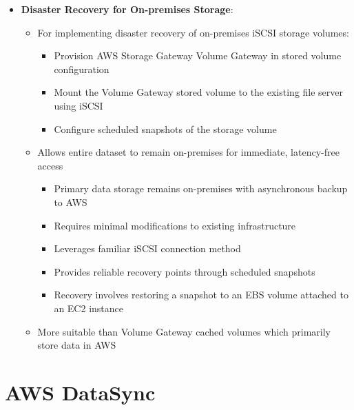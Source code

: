 \documentclass[11pt,a4paper]{report}
\begin{document}
\begin{itemize}
\begin{itemize}
  \item Eliminates costs associated with managing and storing physical tapes
  \item Simplifies backup infrastructure while maintaining compatibility with existing processes
  \item More suitable than NFS interfaces for physical tape replacement
  \item Better than Amazon EFS which doesn't provide tape library emulation
\end{itemize}
  \item \textbf{Disaster Recovery for On-premises Storage}:
\begin{itemize}
  \item For implementing disaster recovery of on-premises iSCSI storage volumes:
\begin{itemize}
  \item Provision AWS Storage Gateway Volume Gateway in stored volume configuration
  \item Mount the Volume Gateway stored volume to the existing file server using iSCSI
  \item Configure scheduled snapshots of the storage volume
\end{itemize}
  \item Allows entire dataset to remain on-premises for immediate, latency-free access
\begin{itemize}
  \item Primary data storage remains on-premises with asynchronous backup to AWS
  \item Requires minimal modifications to existing infrastructure
  \item Leverages familiar iSCSI connection method
  \item Provides reliable recovery points through scheduled snapshots
  \item Recovery involves restoring a snapshot to an EBS volume attached to an EC2 instance
\end{itemize}
  \item More suitable than Volume Gateway cached volumes which primarily store data in AWS
\end{itemize}
\end{itemize}


\section{AWS DataSync}
\end{document}
